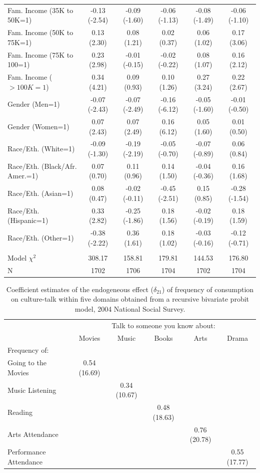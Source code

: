 \documentclass[11pt]{article}
\begin{document}
\begin{table}[t]
\begin{tabular*}{\hsize}{@{\extracolsep{\fill}} l*{5}{c}}
Fam. Income (35K to 50K=1)   &-0.13 (-2.54)&-0.09 (-1.60)&-0.06 (-1.13)&-0.08 (-1.49)&-0.06 (-1.10)\\
Fam. Income (50K to 75K=1)   &0.13 (2.30)&0.08 (1.21)&0.02 (0.37)&0.06 (1.02)&0.17 (3.06)\\
Fam. Income (75K to 100=1)   &0.23 (2.98)&-0.01 (-0.15)&-0.02 (-0.22)&0.08 (1.07)&0.16 (2.12)\\
Fam. Income ($>100K=1$)         &0.34 (4.21)&0.09 (0.93)&0.10 (1.26)&0.27 (3.24)&0.22 (2.67)\\
Gender (Men=1)                &-0.07 (-2.43)&-0.07 (-2.49)&-0.16 (-6.12)&-0.05 (-1.60)&-0.01 (-0.50)\\
Gender (Women=1)              &0.07 (2.43)&0.07 (2.49)&0.16 (6.12)&0.05 (1.60)&0.01 (0.50)\\
Race/Eth. (White=1)           &-0.09 (-1.30)&-0.19 (-2.19)&-0.05 (-0.70)&-0.07 (-0.89)&0.06 (0.84)\\
Race/Eth. (Black/Afr. Amer.=1)&0.07 (0.70)&0.11 (0.96)&0.14 (1.50)&-0.04 (-0.36)&0.16 (1.68)\\
Race/Eth. (Asian=1)           &0.08 (0.47)&-0.02 (-0.11)&-0.45 (-2.51)&0.15 (0.85)&-0.28 (-1.54)\\
Race/Eth. (Hispanic=1)        &0.33 (2.82)&-0.25 (-1.86)&0.18 (1.56)&-0.02 (-0.19)&0.18 (1.59)\\
Race/Eth. (Other=1)           &-0.38 (-2.22)&0.36 (1.61)&0.18 (1.02)&-0.03 (-0.16)&-0.12 (-0.71)\\ \\
Model $\chi^{2}$                       &   308.17&   158.81&   179.81&   144.53&   176.80\\
N                             &     1702&     1706&     1704&     1702&     1704\\
\hline
\end{tabular*}
\label{tab2b}
\end{table}

\begin{table}[t]
\caption{Coefficient estimates of the endogeneous effect ($\delta_{21}$) of frequency of consumption on culture-talk within five domains obtained from a recursive bivariate probit model, 2004 National Social Survey.}
\begin{tabular*}{\hsize}{@{\extracolsep{\fill}} l*{5}{c}}
\hline
\hline
&\multicolumn{5}{c}{Talk to someone you know about:}\\
&Movies&Music&Books&Arts&Drama\\
\hline
Frequency of:&&&&\\
Going to the Movies&0.54 (16.69)&&&\\
Music Listening&&0.34 (10.67)&&&\\
Reading&&&0.48 (18.63)&&\\
Arts Attendance&&&&0.76 (20.78)&\\
Performance Attendance&&&&&0.55 (17.77)\\
\hline
\end{tabular*}
\label{tab3}
\end{table}
\end{document}
